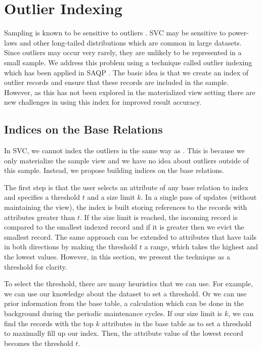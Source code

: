 \section{Outlier Indexing}\label{outlier}
Sampling is known to be sensitive to outliers \cite{clauset2009power, chaudhuri2001overcoming}.
SVC may be sensitive to power-laws and other long-tailed distributions which are common in large datasets\cite{clauset2009power}.
Since outliers may occur very rarely, they are unlikely to be represented in a small sample. 
We address this problem using a technique called outlier indexing which has been applied in SAQP \cite{chaudhuri2001overcoming}.
The basic idea is that we create an index of outlier records and ensure that these records are included in the sample.
However, as this has not been explored in the materialized view setting there are new challenges in using this index for improved result accuracy.

\subsection{Indices on the Base Relations}
In SVC, we cannot index the outliers in the same way as \cite{chaudhuri2001overcoming}. 
This is because we only materialize the sample view and we have no idea about outliers outside of this sample.
Instead, we propose building indices on the base relations.

The first step is that the user selects an attribute of any base relation to index and specifies a threshold $t$ and a size limit $k$.
In a single pass of updates (without maintaining the view), the index is built storing references to the records with attributes greater than $t$.
If the size limit is reached, the incoming record is compared to the smallest indexed record and if it is greater then we evict the smallest record.
The same approach can be extended to attributes that have tails in both directions by making the threshold $t$ a range, which takes the highest and the lowest values.
However, in this section, we present the technique as a threshold for clarity.

To select the threshold, there are many heuristics that we can use.
For example, we can use our knowledge about the dataset to set a threshold.
Or we can use prior information from the base table, a calculation which can be done in the background during the periodic maintenance cycles.
If our size limit is $k$, we can find the records with the top $k$ attributes in the base table as to set a threshold to maximally fill up our index. 
Then, the attribute value of the lowest record becomes the threshold $t$.

